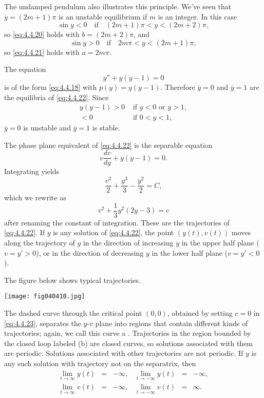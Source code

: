 \documentclass{ximera}
\begin{document}
The undamped pendulum also illustrates this principle. We've seen that
$\overline{y}=(2m+1)\pi$ is an unstable equilibrium if $m$ is an
integer. In this case
$$
\sin y<0\quad\mbox{if}\quad(2m+1)\pi<y<(2m+2)\pi,
$$
so \eqref{eq:4.4.20} holds with $b=(2m+2)\pi$, and
$$
\sin y>0\quad\mbox{if}\quad 2m\pi<y<(2m+1)\pi,
$$
so \eqref{eq:4.4.21} holds with $a=2m\pi$.
 
 
\begin{example} \label{example:4.4.3}
The equation
\begin{equation} \label{eq:4.4.22}
y''+y(y-1)=0
\end{equation}
is of the form \eqref{eq:4.4.18} with $p(y)=y(y-1)$. Therefore $\overline{y}=0$ and $\overline{y}=1$ are the equilibria of \eqref{eq:4.4.22}. Since
\begin{eqnarray*}
y(y-1)>0 &\mbox{ if } y<0\mbox{ or }y>1,\\
<0&\mbox{ if } 0<y<1,
\end{eqnarray*}
$\overline{y}=0$ is unstable and $\overline{y}=1$ is
stable.
 
The phase plane equivalent of \eqref{eq:4.4.22} is the separable equation
$$
v\frac{dv}{dy}+y(y-1)=0.
$$
Integrating yields
$$
\frac{v^2}{2}+\frac{y^3}{3}-\frac{y^2}{2}=C,
$$
which we rewrite  as
\begin{equation} \label{eq:4.4.23}
v^2+\frac{1}{3}y^2(2y-3)=c
\end{equation}
after renaming the constant of integration. These are the trajectories
of \eqref{eq:4.4.22}. If $y$ is any solution of \eqref{eq:4.4.22},  the
point $(y(t),v(t))$ moves along the trajectory of $y$ in the direction
of increasing $y$ in the upper half plane ($v=y'>0$), or in the
direction of decreasing $y$ in the lower half plane ($v=y'<0$).
 
The figure below shows
typical trajectories.
 
\begin{image}
 \texttt{[image: fig040410.jpg]}
\end{image}
 
 
The
dashed curve through the critical point $(0,0)$, obtained by setting
$c=0$ in \eqref{eq:4.4.23}, separates the $y$-$v$ plane into regions
that contain different kinds of trajectories; again,
 we call this curve a .
Trajectories in the region bounded by the closed loop labeled (b) are closed
curves,
so solutions associated with them are periodic. Solutions associated
with other trajectories are not periodic. If $y$ is any such solution
with trajectory not  on the separatrix, then
$$
\begin{array}{llrllr}
\lim_{t\rightarrow\infty}y(t)&=&-\infty, &\lim_{t\rightarrow-\infty}y(t)&=&-\infty,\\
\lim_{t\rightarrow\infty}v(t)&=&-\infty,
&\lim_{t\rightarrow-\infty}v(t)&=&\infty.
\end{array}
$$
 

\end{example}
\end{document}
